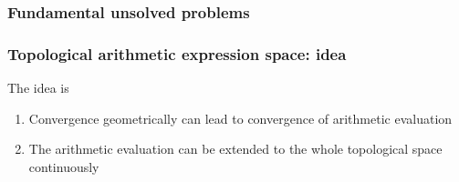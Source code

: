 \documentclass[aspectratio=169]{beamer}
\begin{document}
\begin{frame}
    \frametitle{Fundamental unsolved problems}
    \begin{figure}[ht]\centering
    \end{figure}
\end{frame}

\begin{frame}
    \frametitle{Topological arithmetic expression space: idea}
    The idea is
    \begin{enumerate}
        \item Convergence geometrically can lead to convergence of arithmetic evaluation
        \item The arithmetic evaluation can be extended to the whole topological space continuously
    \end{enumerate}
\end{frame}
\end{document}

